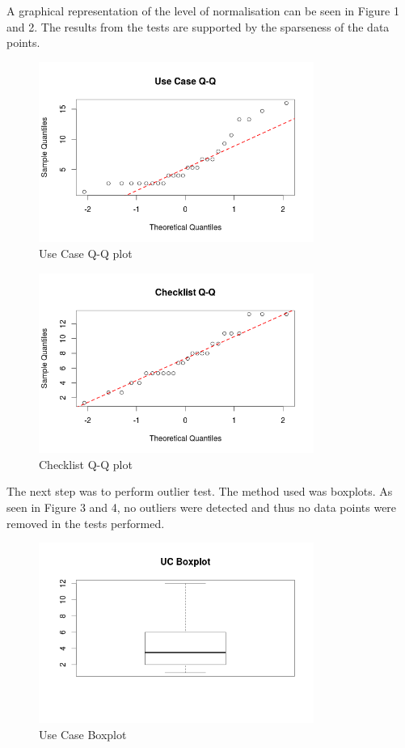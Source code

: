 \documentclass[10pt,twocolumn]{article}
\begin{document}
A graphical representation of the level of normalisation can be seen in Figure 1 and 2. The results from the tests are supported by the sparseness of the data points. 

\begin{figure}[Ht]
\centering
\includegraphics[width=90mm]{uc_qq.png}
\caption{Use Case Q-Q plot}
\end{figure}

\begin{figure}[Ht]
\centering
\includegraphics[width=90mm]{cl_qq.png}
\caption{Checklist Q-Q plot}
\end{figure}


The next step was to perform outlier test. The method used was boxplots. As seen in Figure 3 and 4, no outliers were detected and thus no data points were removed in the tests performed. 

\begin{figure}[Ht!]
\centering
\includegraphics[width=90mm]{uc_box.png}
\caption{Use Case Boxplot}
\end{figure}
\end{document}
